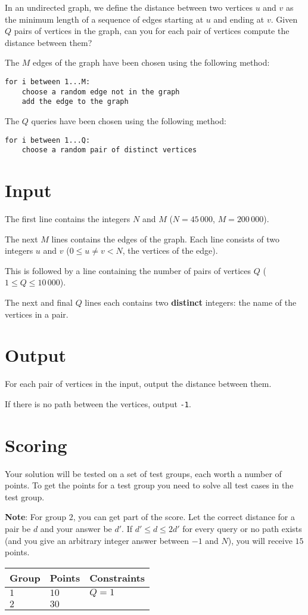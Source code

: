 In an undirected graph, we define the distance between two vertices $u$ and $v$ as the minimum length of a sequence of edges starting at $u$ and ending at $v$.
Given $Q$ pairs of vertices in the graph, can you for each pair of vertices compute the distance between them?

The $M$ edges of the graph have been chosen using the following method:
\begin{verbatim}
for i between 1...M:
    choose a random edge not in the graph
    add the edge to the graph
\end{verbatim}

The $Q$ queries have been chosen using the following method:
\begin{verbatim}
for i between 1...Q:
    choose a random pair of distinct vertices
\end{verbatim}

\section*{Input}
The first line contains the integers $N$ and $M$ ($N = 45\,000$, $M = 200\,000$). 

The next $M$ lines contains the edges of the graph.
Each line consists of two integers $u$ and $v$ ($0 \le u \neq v < N$, the vertices of the edge).

This is followed by a line containing the number of pairs of vertices $Q$ ($1 \le Q \le 10\,000$).

The next and final $Q$ lines each contains two \textbf{distinct} integers: the name of the vertices in a pair.

\section*{Output}
For each pair of vertices in the input, output the distance between them.

If there is no path between the vertices, output \texttt{-1}.

\section*{Scoring}
Your solution will be tested on a set of test groups, each worth a number of points.
To get the points for a test group you need to solve all test cases in the test group.

\textbf{Note}: For group $2$, you can get part of the score.
Let the correct distance for a pair be $d$ and your answer be $d'$.
If $d' \le d \le 2d'$ for every query or no path exists (and you give an arbitrary integer answer between $-1$ and $N$), you will receive $15$ points. 

\noindent
\begin{tabular}{| l | l | p{10cm} |}
  \hline
  Group & Points & Constraints \\ \hline
  $1$    & $10$        &  $Q = 1$ \\ \hline
  $2$    & $30$       & \\ \hline
\end{tabular}
